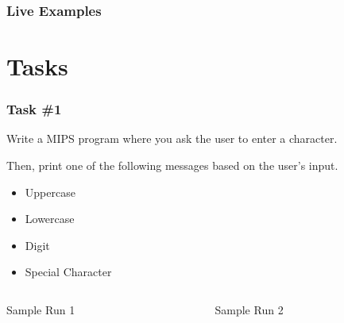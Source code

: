 \documentclass[
	10pt, %
	hmargin=1cm,vmargin=0cm,head=0.5cm,headsep=0pt,foot=0.5cm,margin=2cm
]{beamer}
\begin{document}
\begin{frame}
	\frametitle{Live Examples}
	
\end{frame}


\section{Tasks}

\begin{frame}
	\frametitle{Task \#1}
	Write a MIPS program where you ask the user to enter a character.

	Then, print one of the following messages based on the user's input.
	\begin{itemize}
		\item Uppercase
		\item Lowercase
		\item Digit
		\item Special Character
	\end{itemize}

	\vspace{0.5cm}
	\begin{columns}[c]
		\begin{column}{0.2\textwidth}
			Sample Run 1

		\end{column}
		\begin{column}{0.2\textwidth}
			Sample Run 2

		\end{column}
	\end{columns}
\end{frame}
\end{document}
